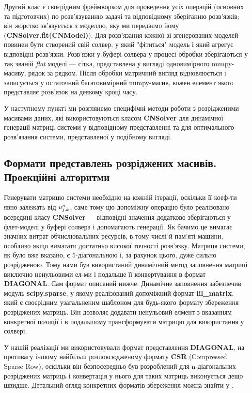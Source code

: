 Другий клас є своєрідним фреймворком для проведення усіх операцій (основних та підготовчих) по розв’язуванню задачі та відповідному зберіганню розв’язків; він жорстко зв’язується з моделлю, яку ми передаємо йому (\textbf{CNSolver.fit(CNModel)}). Для розв’язання кожної зі згенерованих моделей повинен бути створений свій солвер, у який "фітиться" модель і який агрегує відповідні розв’язки. Розв’язки у буфері солвера у процесі обробки зберігаються у так званій \textit{flat} моделі --- сітка, представлена у вигляді одновимірного numpy-масиву, рядок за рядком. Після обробки матричний вигляд відновлюється і записується у остаточний багатовимірний numpy-масив, кожен елемент якого представляє розв’язок на деякому кроці часу.

У наступному пункті ми розглянемо специфічні методи роботи з розрідженими масивами даних, які використовуються класом \textbf{CNSolver} для динамічної генерації  матриці системи у відповідному представленні та для оптимального розв’язання системи, представленої у подібному вигляді.\\

\subsection{Формати представлень розріджених масивів. Проекційні алгоритми}
Генерувати матрицю системи необхідно на кожній ітерації, оскільки її коеф-ти явно залежать від $\un{0}{0}$, саме тому цю допоміжну операцію було реалізовано всередині класу \textbf{CNSolver} --- відповідні значення додатково зберігаються у флет-моделі у буфері солвера і допомагають генерації. Як бачимо це вимагає значних витрат обчислювальних ресурсів, в тому числі й пам’яті машини, особливо якщо вимагати достатньо високої точності розв’язку. Матриця системи, як було вже вказано, є 5-діагональною і, за рахунок цього, дуже сильно розрідженою. Тому нами був використаний динамічний метод заповнення матриці виключно ненульовими ел-ми і подальше її конвертування в формат \textbf{DIAGONAL}. Сам формат описаний нижче. Динамічне заповнення забезпечив модуль \textbf{scipy.sparse}, у якому реалізований допоміжний формат \textbf{lil\_matrix}, який є своєрідним узагальненим шаблоном для будь-якого формату збереження розріджених матриць. Він дозволяє додавати ненульовий елмент з вказанням конкретної позиції і в подальшому трансформувати матрицю для використання у солвері.

У нашій реалізації ми використовували формат представлення \textbf{DIAGONAL}, на противагу іншому найбільш розповсюдженому формату \textbf{CSR} (Compressed Sparse Row), оскільки він безпосередньо був розроблений для n-діагональних розріджених матриць і конвертація у нього для таких матриць виконується дещо швидше. Детальний огляд конкретних форматів збереження можна знайти у \cite{saad}.


